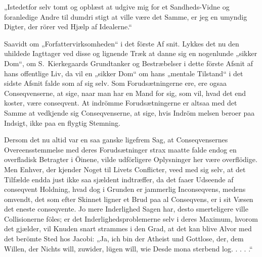 \documentclass[12pt,a4paper]{article}
\newcommand{\opage}[1]{\marginnote{\footnotesize\textit{[#1]}}}
\begin{document}
„Istedetfor selv tomt og opblæst at udgive mig
for et Sandheds-Vidne og foranledige Andre til dumdri\-%
stigt at ville være det Samme, er jeg en umyndig Digter,
der rörer ved Hjælp af Idealerne.“

Saavidt om „Forfattervirksomheden“ i det förste Af\-%
snit. Lykkes det nu den uhildede Iagttager ved disse
\opage{16} og lignende Træk at danne sig en nogenlunde „sikker
Dom“, om S.\ Kierkegaards Grundtanker og Bestræbelser
i dette förste Afsnit af hans offentlige Liv, da vil en
„sikker Dom“ om hans „mentale Tilstand“ i det sidste
Afsnit falde som af sig selv. Som Forudsætningerne ere,
ere ogsaa Conseqvenserne, at sige, naar man har en Mand
for sig, som vil, hvad det end koster, være conseqvent.
At indrömme Forudsætningerne er altsaa med det Samme
at vedkjende sig Conseqvenserne, at sige, hvis Indröm\-%
melsen beroer paa Indsigt, ikke paa en flygtig Stemning.

Dersom det nu altid var en saa ganske ligefrem
Sag, at Conseqvensernes Overeensstemmelse med deres
Forudsætninger strax maatte falde endog en overfladisk
Betragter i Öinene, vilde udförligere Oplysninger her
være overflödige. Men Enhver, der kjender Noget til
Livets Conflicter, veed med sig selv, at det Tilfælde
endda just ikke saa sjældent indtræffer, da det faaer
Udseende af conseqvent Holdning, hvad dog i Grunden
er jammerlig Inconseqvens, medens omvendt, det som
efter Skinnet ligner et Brud paa al Conseqvens, er i sit
Væsen det eneste conseqvente. Jo mere Inderlighed
Sagen har, desto smerteligere ville Collisionerne föles;
er det Inderlighedsproblemerne selv i deres Maximum,
hvorom det gjælder, vil Knuden snart strammes i den
Grad, at det kan blive Alvor med det berömte Sted hos
Jacobi: „Ja, ich bin der Atheist und Gottlose, der, dem
Willen, der Nichts will, zuwider, lügen will, wie Desde\-%
mona sterbend log. . . . .“
\end{document}
